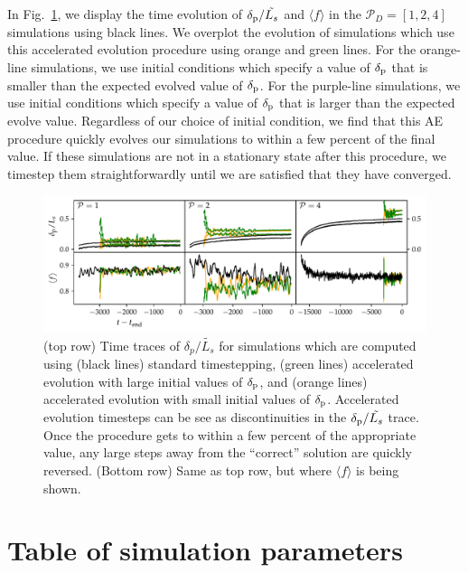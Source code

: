 \documentclass{aastex631}
\newcommand{\delp}{\ensuremath{\delta_{\rm{p}}}}
\newcommand{\mP}{\ensuremath{\mathcal{P}}}
\newcommand{\angles}[1]{\langle #1 \rangle}
\begin{document}
In Fig.~\ref{fig:AE_time_figure}, we display the time evolution of $\delp/\tilde{L_s}$ and $\angles{f}$ in the $\mP_D = [1,2,4]$ simulations using black lines.
We overplot the evolution of simulations which use this accelerated evolution procedure using orange and green lines.
For the orange-line simulations, we use initial conditions which specify a value of $\delp$ that is smaller than the expected evolved value of $\delp$.
For the purple-line simulations, we use initial conditions which specify a value of $\delp$ that is larger than the expected evolve value.
Regardless of our choice of initial condition, we find that this AE procedure quickly evolves our simulations to within a few percent of the final value.
If these simulations are not in a stationary state after this procedure, we timestep them straightforwardly until we are satisfied that they have converged.

\begin{figure}[t!]
\centering
\includegraphics[width=\textwidth]{AE_time_figure.pdf}
\caption{
\label{fig:AE_time_figure}
(top row) Time traces of $\delta_p/\tilde{L_s}$ for simulations which are computed using (black lines) standard timestepping, (green lines) accelerated evolution with large initial values of $\delp$, and (orange lines) accelerated evolution with small initial values of $\delp$.
Accelerated evolution timesteps can be see as discontinuities in the $\delp/\tilde{L_s}$ trace.
Once the procedure gets to within a few percent of the appropriate value, any large steps away from the ``correct'' solution are quickly reversed.
(Bottom row) Same as top row, but where $\angles{f}$ is being shown.
}
\end{figure}



\section{Table of simulation parameters}
\label{app:simulation_table}







\end{document}
